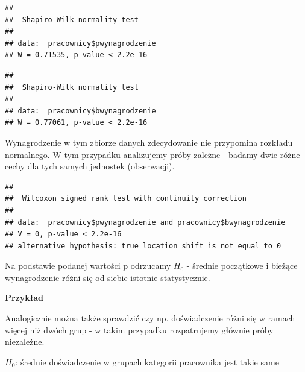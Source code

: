 \documentclass[
]{book}
\newenvironment{Shaded}{\begin{snugshade}}{\end{snugshade}}
\newcommand{\DataTypeTok}[1]{\textcolor[rgb]{0.13,0.29,0.53}{#1}}
\newcommand{\KeywordTok}[1]{\textcolor[rgb]{0.13,0.29,0.53}{\textbf{#1}}}
\newcommand{\NormalTok}[1]{#1}
\newcommand{\OperatorTok}[1]{\textcolor[rgb]{0.81,0.36,0.00}{\textbf{#1}}}
\newcommand{\OtherTok}[1]{\textcolor[rgb]{0.56,0.35,0.01}{#1}}
\begin{document}
\begin{verbatim}
## 
##  Shapiro-Wilk normality test
## 
## data:  pracownicy$pwynagrodzenie
## W = 0.71535, p-value < 2.2e-16
\end{verbatim}

\begin{Shaded}
\end{Shaded}

\begin{verbatim}
## 
##  Shapiro-Wilk normality test
## 
## data:  pracownicy$bwynagrodzenie
## W = 0.77061, p-value < 2.2e-16
\end{verbatim}

Wynagrodzenie w tym zbiorze danych zdecydowanie nie przypomina rozkładu normalnego. W tym przypadku analizujemy próby zależne - badamy dwie różne cechy dla tych samych jednostek (obserwacji).

\begin{Shaded}
\end{Shaded}

\begin{verbatim}
## 
##  Wilcoxon signed rank test with continuity correction
## 
## data:  pracownicy$pwynagrodzenie and pracownicy$bwynagrodzenie
## V = 0, p-value < 2.2e-16
## alternative hypothesis: true location shift is not equal to 0
\end{verbatim}

Na podstawie podanej wartości p odrzucamy \(H_0\) - średnie początkowe i bieżące wynagrodzenie różni się od siebie istotnie statystycznie.

\textbf{Przykład}

Analogicznie można także sprawdzić czy np. doświadczenie różni się w ramach więcej niż dwóch grup - w takim przypadku rozpatrujemy głównie próby niezależne.

\(H_0\): średnie doświadczenie w grupach kategorii pracownika jest takie same
\end{document}
